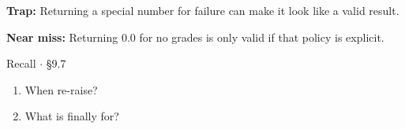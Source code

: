 \documentclass[11pt]{article}
\begin{document}
\begin{keepsection}
\begin{notebox}\textbf{Trap:} Returning a special number for failure can make it look like a valid result.\end{notebox}

\begin{notebox}\textbf{Near miss:} Returning 0.0 for no grades is only valid if that policy is explicit.\end{notebox}

\begin{recallbox}{Recall \ensuremath{\cdot} §9.7}
\begin{enumerate}
\item When re-raise?
\item What is finally for?
\end{enumerate}

\end{recallbox}
\end{keepsection}
\end{document}

